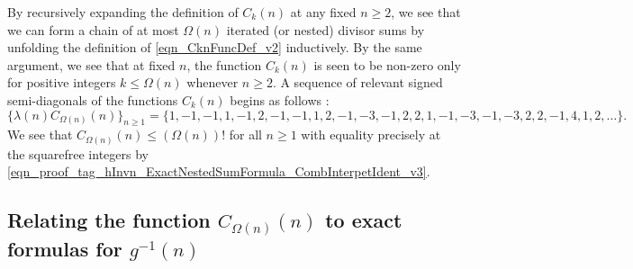 \documentclass[11pt,reqno,a4letter]{article}
\numberwithin{figure}{section}
\numberwithin{table}{section}
\newcommand{\seqnum}[1]{\href{http://oeis.org/#1}{\color{ProcessBlue}{\underline{#1}}}}
\theoremstyle{plain}
\numberwithin{theorem}{section}
\theoremstyle{definition}
\begin{document}
By recursively expanding the definition of $C_k(n)$ 
at any fixed $n \geq 2$, we see that 
we can form a chain of at most $\Omega(n)$ iterated (or nested) divisor sums by 
unfolding the definition of \eqref{eqn_CknFuncDef_v2} inductively. 
By the same argument, we see that at fixed $n$, the function 
$C_k(n)$ is seen to be non-zero only for positive integers 
$k \leq \Omega(n)$ whenever $n \geq 2$. 
A sequence of relevant signed semi-diagonals of the functions $C_k(n)$ begins as follows 
\cite[\seqnum{A008480}]{OEIS}: 
\[
\{\lambda(n) C_{\Omega(n)}(n) \}_{n \geq 1} = \{
     1, -1, -1, 1, -1, 2, -1, -1, 1, 2, -1, -3, -1, 2, 2, 1, -1, -3, -1, 
     -3, 2, 2, -1, 4, 1, 2, \ldots \}. 
\]
We see that $C_{\Omega(n)}(n) \leq (\Omega(n))!$ for all $n \geq 1$ with 
equality precisely at the squarefree integers by 
\eqref{eqn_proof_tag_hInvn_ExactNestedSumFormula_CombInterpetIdent_v3}. 

\subsection{Relating the function $C_{\Omega(n)}(n)$ to exact formulas for $g^{-1}(n)$} 
\label{subSection_Relating_CknFuncs_to_gInvn} 
\end{document}
